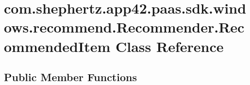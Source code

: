 \hypertarget{classcom_1_1shephertz_1_1app42_1_1paas_1_1sdk_1_1windows_1_1recommend_1_1_recommender_1_1_recommended_item}{\section{com.\+shephertz.\+app42.\+paas.\+sdk.\+windows.\+recommend.\+Recommender.\+Recommended\+Item Class Reference}
\label{classcom_1_1shephertz_1_1app42_1_1paas_1_1sdk_1_1windows_1_1recommend_1_1_recommender_1_1_recommended_item}
}
\subsection*{Public Member Functions}
